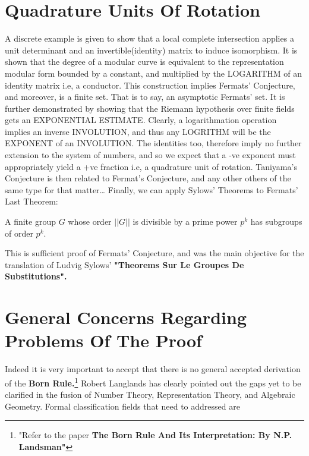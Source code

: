 \documentclass[11pt,fancy]{elegantbook}
\begin{document}
\section{Quadrature Units Of Rotation}
A discrete example is given to show that a local complete intersection applies a unit determinant and an invertible(identity) matrix to induce isomorphism. It is shown that the degree of a modular curve is equivalent to the representation modular form bounded by a constant, and multiplied by the LOGARITHM of an identity matrix i.e, a conductor. 
This construction implies Fermats' Conjecture, and moreover, is a finite set. That is to say, an asymptotic Fermats' set. It is further demonstrated by showing that the Riemann hypothesis over finite fields gets an EXPONENTIAL ESTIMATE.
Clearly, a logarithmation operation implies an inverse INVOLUTION, and thus any LOGRITHM will be the EXPONENT of an INVOLUTION. 
The identities too, therefore imply no further extension to the system of numbers, and so we expect that a -ve exponent must appropriately yield a +ve fraction i.e, a quadrature unit of rotation.
Taniyama's Conjecture is then related to Fermat's Conjecture, and any other others of the same type for that matter\dots
Finally, we can apply Sylows' Theorems to Fermats' Last Theorem: 
\begin{theorem}
A finite group $G$ whose order $||{G}||$ is divisible by a prime power ${p^k}$ has subgroups of order ${p^k}$. 
\end{theorem}
This is sufficient proof of Fermats' Conjecture, and was the main objective for the translation of Ludvig Sylows' \textbf{"Theorems Sur Le Groupes De Substitutions".}

\section{General Concerns Regarding Problems Of The Proof}
Indeed it is very important to accept that there is no general accepted derivation of the \textbf{Born Rule.}\footnote{"Refer to the paper \textbf{The Born Rule And Its Interpretation: By N.P. Landsman"}}
Robert Langlands has clearly pointed out the gaps yet to be clarified in the fusion of Number Theory, Representation Theory, and Algebraic Geometry. Formal classification fields that need to addressed are
\end{document}
